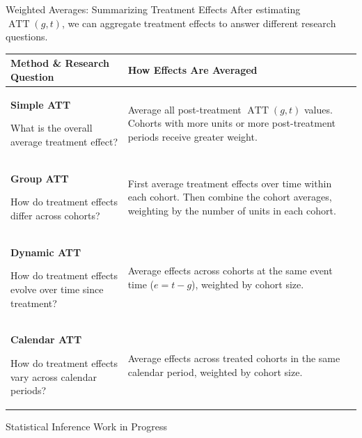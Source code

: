 \documentclass[aspectratio=169,11pt]{beamer}
\renewcommand{\arraystretch}{1.2}
\newcommand{\ATT}{\operatorname{ATT}}
\begin{document}
\begin{frame}[t]{Weighted Averages: Summarizing Treatment Effects}
\setlength{\parskip}{2pt}
After estimating $\ATT(g,t)$, we can aggregate treatment effects to answer
different research questions.
\par\vspace{0.35em}
\begingroup
\small
\setlength{\parskip}{0pt}
\setlength{\aboverulesep}{1pt}
\setlength{\belowrulesep}{1.5pt}
\renewcommand{\arraystretch}{1.0}
\begin{tabular}{@{}L{0.40\textwidth}@{\hspace{0.025\textwidth}}L{0.575\textwidth}@{}}
\toprule
\textbf{Method \& Research Question} & \textbf{How Effects Are Averaged} \\
\midrule
\textbf{Simple ATT}\par
What is the overall average treatment effect? &
Average all post-treatment $\ATT(g,t)$ values. Cohorts with more units or
more post-treatment periods receive greater weight. \\
\midrule
\textbf{Group ATT}\par
How do treatment effects differ across cohorts? &
First average treatment effects over time within each cohort. Then combine
the cohort averages, weighting by the number of units in each cohort. \\
\midrule
\textbf{Dynamic ATT}\par
How do treatment effects evolve over time since treatment? &
Average effects across cohorts at the same event time ($e=t-g$), weighted
by cohort size. \\
\midrule
\textbf{Calendar ATT}\par
How do treatment effects vary across calendar periods? &
Average effects across treated cohorts in the same calendar period,
weighted by cohort size. \\
\bottomrule
\end{tabular}
\endgroup
\end{frame}

\begin{frame}[t]{Statistical Inference}
Work in Progress
\end{frame}
\end{document}
